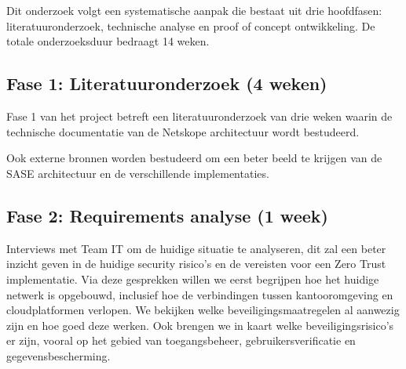 
\chapter{}%
\label{ch:methodologie}


Dit onderzoek volgt een systematische aanpak die bestaat uit drie hoofdfasen: literatuuronderzoek, technische analyse en proof of concept ontwikkeling. De totale onderzoeksduur bedraagt 14 weken.

\section{Fase 1: Literatuuronderzoek (4 weken)}
Fase 1 van het project betreft een literatuuronderzoek van drie weken waarin de technische documentatie van de Netskope architectuur wordt bestudeerd. 

\vspace{2ex}

Ook externe bronnen worden bestudeerd om een beter beeld te krijgen van de SASE architectuur en de verschillende implementaties.

\section{Fase 2: Requirements analyse (1 week)}
Interviews met Team IT om de huidige situatie te analyseren, dit zal een beter inzicht geven in de huidige security risico's en de vereisten voor een Zero Trust implementatie. 
Via deze gesprekken willen we eerst begrijpen hoe het huidige netwerk is opgebouwd, inclusief hoe de verbindingen tussen kantooromgeving en cloudplatformen verlopen. We bekijken welke beveiligingsmaatregelen al aanwezig zijn en hoe goed deze werken. Ook brengen we in kaart welke beveiligingsrisico’s er zijn, vooral op het gebied van toegangsbeheer, gebruikersverificatie en gegevensbescherming.

